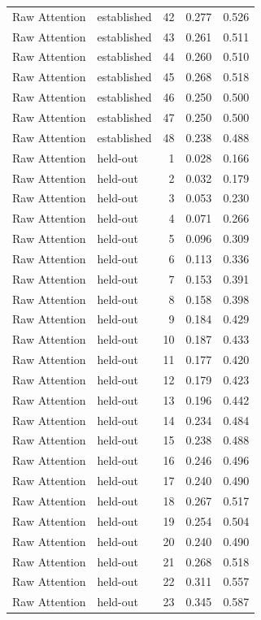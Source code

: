 \begin{tabular}{llrrr}
Raw Attention & established & 42 & 0.277 & 0.526 \\
Raw Attention & established & 43 & 0.261 & 0.511 \\
Raw Attention & established & 44 & 0.260 & 0.510 \\
Raw Attention & established & 45 & 0.268 & 0.518 \\
Raw Attention & established & 46 & 0.250 & 0.500 \\
Raw Attention & established & 47 & 0.250 & 0.500 \\
Raw Attention & established & 48 & 0.238 & 0.488 \\
Raw Attention & held-out & 1 & 0.028 & 0.166 \\
Raw Attention & held-out & 2 & 0.032 & 0.179 \\
Raw Attention & held-out & 3 & 0.053 & 0.230 \\
Raw Attention & held-out & 4 & 0.071 & 0.266 \\
Raw Attention & held-out & 5 & 0.096 & 0.309 \\
Raw Attention & held-out & 6 & 0.113 & 0.336 \\
Raw Attention & held-out & 7 & 0.153 & 0.391 \\
Raw Attention & held-out & 8 & 0.158 & 0.398 \\
Raw Attention & held-out & 9 & 0.184 & 0.429 \\
Raw Attention & held-out & 10 & 0.187 & 0.433 \\
Raw Attention & held-out & 11 & 0.177 & 0.420 \\
Raw Attention & held-out & 12 & 0.179 & 0.423 \\
Raw Attention & held-out & 13 & 0.196 & 0.442 \\
Raw Attention & held-out & 14 & 0.234 & 0.484 \\
Raw Attention & held-out & 15 & 0.238 & 0.488 \\
Raw Attention & held-out & 16 & 0.246 & 0.496 \\
Raw Attention & held-out & 17 & 0.240 & 0.490 \\
Raw Attention & held-out & 18 & 0.267 & 0.517 \\
Raw Attention & held-out & 19 & 0.254 & 0.504 \\
Raw Attention & held-out & 20 & 0.240 & 0.490 \\
Raw Attention & held-out & 21 & 0.268 & 0.518 \\
Raw Attention & held-out & 22 & 0.311 & 0.557 \\
Raw Attention & held-out & 23 & 0.345 & 0.587 \\

\end{tabular}
